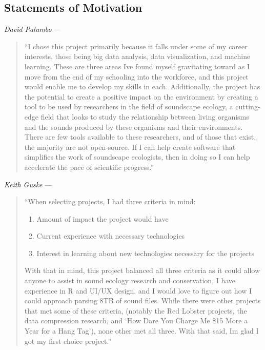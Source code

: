\subsection{Statements of Motivation}
\noindent\textit{David Palumbo} ---
\begin{quote}
``I chose this project primarily because it falls under some of my career interests, those being big data analysis, data visualization, and machine learning. These are three areas I\textquotesingle ve found myself gravitating toward as I move from the end of my schooling into the workforce, and this project would enable me to develop my skills in each. Additionally, the project has the potential to create a positive impact on the environment by creating a tool to be used by researchers in the field of soundscape ecology, a cutting-edge field that looks to study the relationship between living organisms and the sounds produced by these organisms and their environments. There are few tools available to these researchers, and of those that exist, the majority are not open-source. If I can help create software that simplifies the work of soundscape ecologists, then in doing so I can help accelerate the pace of scientific progress.''
\end{quote}

\noindent\textit{Keith Guske} ---
\begin{quote}
``When selecting projects, I had three criteria in mind:
\begin{enumerate}
  \item Amount of impact the project would have
  \item Current experience with necessary technologies
  \item Interest in learning about new technologies necessary for the projects
\end{enumerate}
With that in mind, this project balanced all three criteria as it could allow anyone to assist in sound ecology research and conservation, I have experience in R and UI/UX design, and I would love to figure out how I could approach parsing 8TB of sound files. While there were other projects that met some of these criteria, (notably the Red Lobster projects, the data compression research, and \lq How Dare You Charge Me \$15 More a Year for a Hang Tag\rq), none other met all three. With that said, I\textquotesingle m glad I got my first choice project.''
\end{quote}

